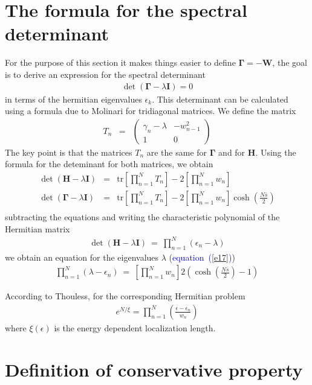 \documentclass[aps,pre,floats,floatfix,twocolumn]{revtex4}
\newcommand{\beq}{\begin{eqnarray}}
\newcommand{\eeq}{\end{eqnarray}}
\newcommand{\Eq}[1]{\textcolor{blue}{{equation}\!~(\ref{#1})}}
\begin{document}
\section{The formula for the spectral determinant}

For the purpose of this section it makes things easier to define ${\bm \Gamma} = -{\bm W}$, the goal is 
to derive an expression for the spectral determinant 
%
\beq
\det ( {\bm\Gamma} - \lambda {\bm I})   = 0
\eeq
%
in terms of the hermitian eigenvalues $\epsilon_k$.
This determinant can be calculated using a formula due to Molinari \cite{det1} for tridiagonal matrices. 
We define the matrix 
%
\beq
T_n &=& \left(
\begin{array}{cc}
 \gamma_{n} -\lambda& -w_{n-1}^2 \\
1 & 0
\end{array}
\right)
\eeq
%
The key point is that the matrices $T_n$ are the same for ${\bm\Gamma}$ and for ${\bm H}$. 
Using the formula for the deteminant for both matrices, we obtain
%
\beq
\det \left( {\bm H} - \lambda \bm{I} \right) &=&  \mathrm{tr}  \left[\prod_{n=1}^N T_n\right] - 2 \left[ \prod_{n=1}^N w_n \right]  \\
\det \left( {\bm \Gamma} - \lambda {\bm I} \right) &=&  \mathrm{tr}  \left[\prod_{n=1}^N T_n\right] - 2 \left[ \prod_{n=1}^N w_n \right] \cosh\left(\frac{N\bar{s}}{2}\right)\\
\eeq
%
subtracting the equations and writing the characteristic polynomial of the Hermitian matrix 
%
\beq
\det \left( {\bm H} - \lambda \bm{I} \right) \ = \ \prod_{n=1}^N \left(  \epsilon_n - \lambda\right) 
\eeq
%
we obtain an equation for the eigenvalues $\lambda$ (\Eq{e17})
%
\beq
 \prod_{n=1}^N \left(  \lambda - \epsilon_n \right)  \ = \   \left[\prod_{n=1}^N w_n\right]  2\left(\cosh\left(\frac{N\bar{s}}{2}\right) -1\right)
\eeq
%

According to Thouless, for the corresponding Hermitian problem
%
\beq
e^{ N / \xi} = \prod_{n=1}^N{ \left(\frac{  \epsilon - \epsilon_n }{  w_n }\right)}
\eeq
%
where $\xi(\epsilon)$ is the energy dependent  localization length.




\section{Definition of conservative property}
\end{document}
